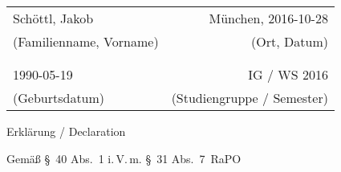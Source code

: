 
\thispagestyle{empty}


\begin{tabularx}{\linewidth}{Xr}
  Schöttl, Jakob          & München, 2016-10-28 \\
  (Familienname, Vorname) & (Ort, Datum) \\
  \\
  \\
  1990-05-19              & IG / WS 2016 \\
  (Geburtsdatum)          & (Studiengruppe / Semester)
\end{tabularx}

\vspace{3cm}

{\centering\bfseries

\Large Erklärung / Declaration

\vspace{0.5em}

\small Gemäß §~40 Abs.~1 i.\,V.\,m. §~31 Abs.~7~RaPO

}
\vspace{2em}

